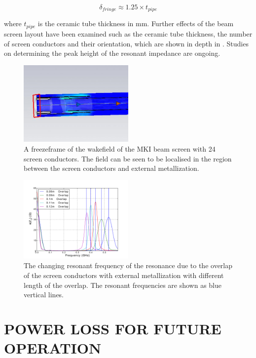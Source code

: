 \documentclass{JAC2003}
\begin{document}
\begin{equation}
\delta_{fringe} \approx 1.25 \times t_{pipe}
\end{equation}

where $t_{pipe}$ is the ceramic tube thickness in mm. Further effects of the beam screen layout have been examined such as the ceramic tube thickness, the number of screen conductors and their orientation, which are shown in depth in \cite{DayThesis}. Studies on determining the peak height of the resonant impedance are ongoing.

\begin{figure}
\includegraphics[width=0.5\textwidth]{resField.jpeg}
\caption{A freezeframe of the wakefield of the MKI beam screen with 24 screen conductors. The field can be seen to be localised in the region between the screen conductors and external metallization.}
\label{fig:mkiResFieldPat}
\end{figure}

\begin{figure}
\includegraphics[width=0.5\textwidth]{mki-overlap-len-real-imp-zoom.pdf}
\caption{The changing resonant frequency of the resonance due to the overlap of the screen conductors with external metallization with different length of the overlap. The resonant frequencies are shown as blue vertical lines.}
\label{fig:mkiOverlapRes}
\end{figure}

\section{POWER LOSS FOR FUTURE OPERATION}
\end{document}
